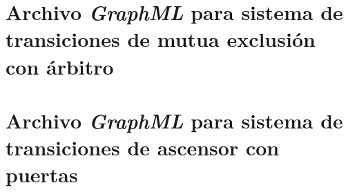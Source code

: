 \section{Archivo \textit{GraphML} para sistema de transiciones de mutua exclusión con árbitro} \label{cap:graphml_arbitro}


\section{Archivo \textit{GraphML} para sistema de transiciones de ascensor con puertas} \label{cap:graphml_ascensor}

